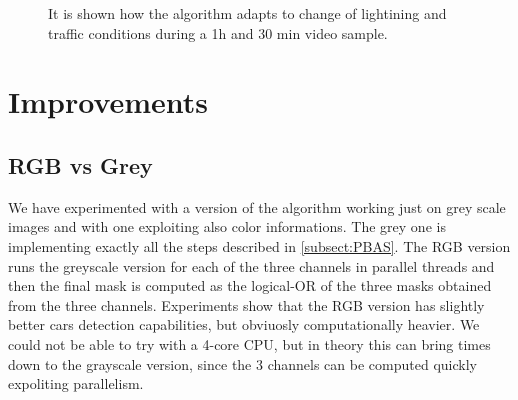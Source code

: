 \begin{figure}[!t]
    \centering
    \newline
    \newline
    \newline
    \newline
    \caption{It is shown how the algorithm adapts to change of lightining and traffic conditions during a 1h and 30 min video sample.}
\end{figure}

\section*{Improvements}

\subsection*{RGB vs Grey}
We have experimented with a version of the algorithm working just on grey scale images and with one exploiting also color informations. The grey one is implementing exactly all the steps described in \ref{subsect:PBAS}. The RGB version runs the greyscale version for each of the three channels in parallel threads and then the final mask is computed as the logical-OR of the three masks obtained from the three channels.
Experiments show that the RGB version has slightly better cars detection capabilities, but obviuosly computationally heavier. We could not be able to try with a 4-core CPU, but in theory this can bring times down to the grayscale version, since the 3 channels can be computed quickly expoliting parallelism.

